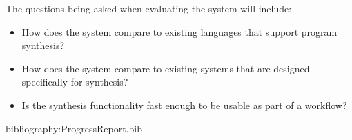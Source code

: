 \documentclass[a4paper]{article}
\begin{document}
The questions being asked when evaluating the system will include: 

\begin{itemize}
\item How does the system compare to existing languages that support program synthesis?
\item How does the system compare to existing systems that are designed specifically for synthesis?
\item Is the synthesis functionality fast enough to be usable as part of a workflow?
\end{itemize}

\clearpage
\nocite{*}
bibliography:ProgressReport.bib
\clearpage
\end{document}

